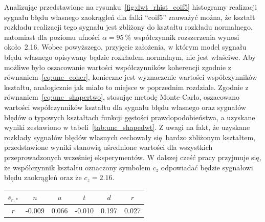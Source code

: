 Analizując przedstawione na rysunku~\ref{fig:dwt_rhist_coif5} histogramy realizacji sygnału błędu własnego zaokrągleń dla falki \enquote{coif5} zauważyć można, że kształt rozkładu realizacji tego sygnału jest zbliżony do kształtu rozkładu normalnego, natomiast dla poziomu ufności $\alpha = \qty{95}{\percent}$ współczynnik rozszerzenia wynosi około~\num{2.16}. Wobec powyższego, przyjęcie założenia, w którym model sygnału błędu własnego opisywany będzie rozkładem normalnym, nie jest właściwe. Aby możliwe było oszacowanie wartości współczynników koherencji zgodnie z równaniem~\eqref{eq:unc_coher}, konieczne jest wyznaczenie wartości współczynników kształtu, analogicznie jak miało to miejsce w poprzednim rozdziale. Zgodnie z równaniem~\eqref{eq:unc_shapertwo}, stosując metodę Monte-Carlo, oszacowano wartości współczynników kształtu dla sygnału błędu własnego oraz sygnałów błędów o typowych kształtach funkcji gęstości prawdopodobieństwa, a uzyskane wyniki zestawiono w tabeli~\ref{tab:unc_shapedwt}. Z uwagi na fakt, że uzyskane rozkłady sygnałów błędów własnych cechowały się bardzo zbliżonym kształtem, przedstawione wyniki stanowią uśrednione wartości dla wszystkich przeprowadzonych wcześniej eksperymentów. W dalszej cześć pracy przyjmuje się, że współczynnik kształtu oznaczony symbolem $c_{z}$ odpowiadać będzie sygnałowi błędu zaokrągleń oraz że $c_{z} = \num{2.16}$.

\begin{table}[htb!]
\begin{center}
\begin{tabular}[c]{| c *{5}{| S[table-format = +1.3] } |} \hline
$s_{r,*}$ & \textbf{$n$} & \textbf{$u$} & \textbf{$t$} & \textbf{$d$} & \textbf{$r$} \\ \hline
$r$       & -0.009       & 0.066        & -0.010       & 0.197        & 0.027        \\ \hline
\end{tabular}
\end{center}
\end{table}

